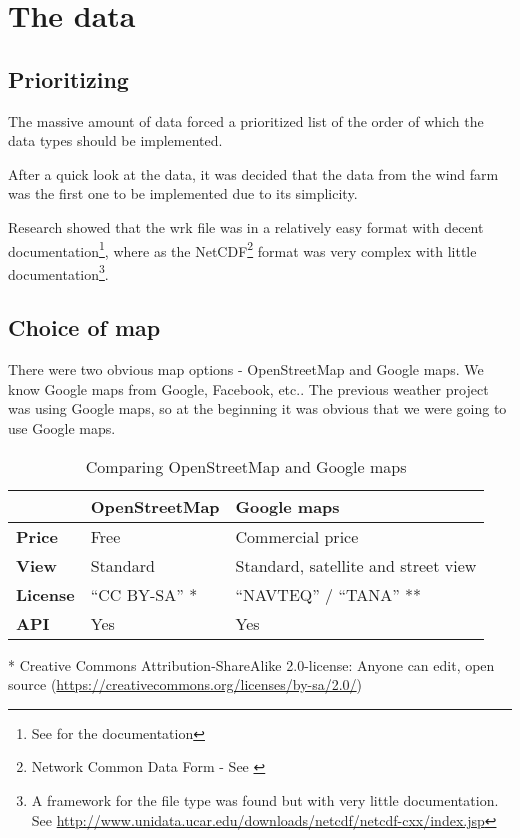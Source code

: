 \section{The data}
\subsection{Prioritizing}
The massive amount of data forced a prioritized list of the order of which the data types should be implemented.

After a quick look at the data, it was decided that the data from the wind farm was the first one to be implemented due to its simplicity.

Research showed that the wrk file was in a relatively easy format with decent documentation\footnote{See \cite{VRIS} for the documentation}, where as the NetCDF\footnote{Network Common Data Form - See \cite{netcdf}} format was very complex with little documentation\footnote{A framework for the file type was found but with very little documentation. See \url{http://www.unidata.ucar.edu/downloads/netcdf/netcdf-cxx/index.jsp}}.

\subsection{Choice of map}
There were two obvious map options - OpenStreetMap and Google maps. We know Google maps from Google, Facebook, etc.. The previous weather project was using Google maps, so at the beginning it was obvious that we were going to use Google maps.

\begin{table}[htbp]
\centering
\begin{tabular}{| l | l | l |}
\hline
& \textbf{OpenStreetMap} & \textbf{Google maps} \\
\hline
\textbf{Price} & Free & Commercial price \\
\hline
\textbf{View} & Standard & Standard, satellite and street view \\
\hline
\textbf{License} & ``CC BY-SA'' * & ``NAVTEQ'' / ``TANA'' ** \\
\hline
\textbf{API} & Yes & Yes \\
\hline
\end{tabular}
\caption{Comparing OpenStreetMap and Google maps}
\label{tab:osm_vs_google}
\end{table}
* Creative Commons Attribution-ShareAlike 2.0-license: Anyone can edit, open source (\url{https://creativecommons.org/licenses/by-sa/2.0/})

